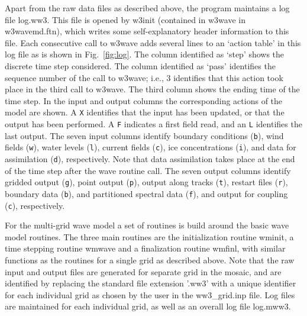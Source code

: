 Apart from the raw data files as described above, the program maintains a log
file {\file log.ww3}. This file is opened by {\F w3init} (contained in {\F
  w3wave} in {\file w3wavemd.ftn}), which writes some self-explanatory header
information to this file. Each consecutive call to {\F w3wave} adds several
lines to an `action table' in this log file as is shown in
Fig.~\ref{fig:log}. The column identified as `step' shows the discrete time
step considered. The column identified as `pass' identifies the sequence
number of the call to {\F w3wave}; i.e., 3 identifies that this action took
place in the third call to {\F w3wave}. The third column shows the ending time
of the time step. In the input and output columns the corresponding actions of
the model are shown. A {\tt X} identifies that the input has been updated, or
that the output has been performed. A {\tt F} indicates a first field read,
and an {\tt L} identifies the last output. The seven input columns identify
boundary conditions ({\tt b}), wind fields ({\tt w}), water levels ({\tt l}),
current fields ({\tt c}), ice concentrations ({\tt i}), and data for
assimilation ({\tt d}), respectively. Note that data assimilation takes place
at the end of the time step after the wave routine call. The seven output
columns identify gridded output ({\tt g}), point output ({\tt p}), output
along tracks ({\tt t}), restart files ({\tt r}), boundary data ({\tt b}), and
partitioned spectral data ({\tt f}), and output for coupling ({\tt c}),
respectively.

For the multi-grid wave model \citep[][{\file ww3\_multi}]{tol:OMOD08b} a set
of routines is build around the basic wave model routines. The three main
routines are the initialization routine {\F wminit}, a time stepping routine
{\F wmwave} and a finalization routine {\F wmfinl}, with similar functions as
the routines for a single grid as described above. Note that the raw input and
output files are generated for separate grid in the mosaic, and are identified
by replacing the standard file extension '{\file .ww3}' with a unique
identifier for each individual grid as chosen by the user in the 
{\file ww3\_grid.inp} file. Log files are maintained for each individual grid, 
as well as an overall log file {\file log.mww3}.
